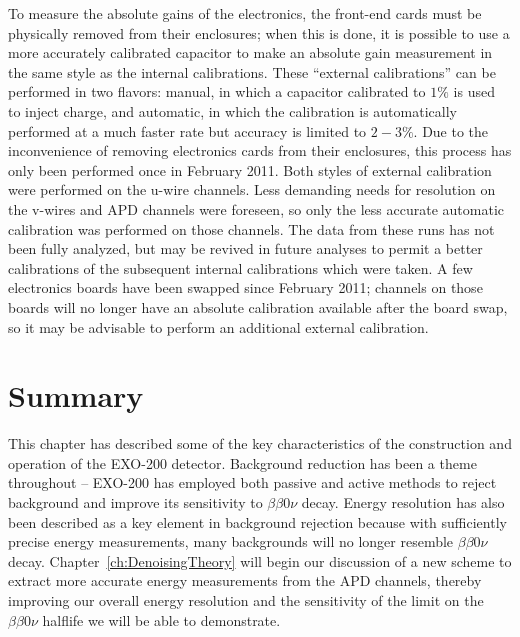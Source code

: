 To measure the absolute gains of the electronics, the front-end cards must be physically removed from their enclosures; when this is done, it is possible to use a more accurately calibrated capacitor to make an absolute gain measurement in the same style as the internal calibrations.  These ``external calibrations'' can be performed in two flavors: manual, in which a capacitor calibrated to $1\%$ is used to inject charge, and automatic, in which the calibration is automatically performed at a much faster rate but accuracy is limited to $2-3\%$.  Due to the inconvenience of removing electronics cards from their enclosures, this process has only been performed once in February 2011.  Both styles of external calibration were performed on the u-wire channels.  Less demanding needs for resolution on the v-wires and APD channels were foreseen, so only the less accurate automatic calibration was performed on those channels.  The data from these runs has not been fully analyzed, but may be revived in future analyses to permit a better calibrations of the subsequent internal calibrations which were taken.  A few electronics boards have been swapped since February 2011; channels on those boards will no longer have an absolute calibration available after the board swap, so it may be advisable to perform an additional external calibration.~\cite{EnergyDocumentRun2a}

\section{Summary}

This chapter has described some of the key characteristics of the construction and operation of the EXO-200 detector.  Background reduction has been a theme throughout -- EXO-200 has employed both passive and active methods to reject background and improve its sensitivity to $\beta\beta 0\nu$ decay.  Energy resolution has also been described as a key element in background rejection because with sufficiently precise energy measurements, many backgrounds will no longer resemble $\beta\beta 0\nu$ decay.  Chapter~\ref{ch:DenoisingTheory} will begin our discussion of a new scheme to extract more accurate energy measurements from the APD channels, thereby improving our overall energy resolution and the sensitivity of the limit on the $\beta\beta 0\nu$ halflife we will be able to demonstrate.
